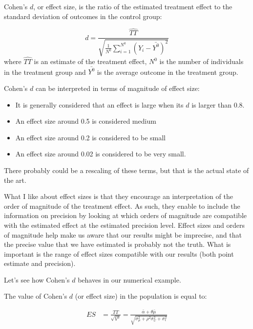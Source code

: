 \documentclass[]{book}
\providecommand{\tightlist}{%
  \setlength{\itemsep}{0pt}\setlength{\parskip}{0pt}}
\theoremstyle{definition}
\theoremstyle{definition}
\theoremstyle{definition}
\theoremstyle{remark}
\let\BeginKnitrBlock\begin \let\EndKnitrBlock\end
\begin{document}
\BeginKnitrBlock{definition}[Cohen's $d$]
\protect\hypertarget{def:unnamed-chunk-40}{}{\label{def:unnamed-chunk-40} \iffalse (Cohen's \(d\)) \fi{} }Cohen's \(d\), or effect size, is the ratio of the estimated treatment effect to the standard deviation of outcomes in the control group:
\EndKnitrBlock{definition}

\[
d = \frac{\hat{TT}}{\sqrt{\frac{1}{N^0}\sum_{i=1}^{N^0}(Y_i-\bar{Y^0})^2}}
\]
where \(\hat{TT}\) is an estimate of the treatment effect, \(N^0\) is the number of individuals in the treatment group and \(\bar{Y^0}\) is the average outcome in the treatment group.

Cohen's \(d\) can be interpreted in terms of magnitude of effect size:

\begin{itemize}
\tightlist
\item
  It is generally considered that an effect is large when its \(d\) is larger than 0.8.
\item
  An effect size around 0.5 is considered medium
\item
  An effect size around 0.2 is considered to be small
\item
  An effect size around 0.02 is considered to be very small.
\end{itemize}

There probably could be a rescaling of these terms, but that is the actual state of the art.

What I like about effect sizes is that they encourage an interpretation of the order of magnitude of the treatment effect.
As such, they enable to include the information on precision by looking at which orders of magnitude are compatible with the estimated effect at the estimated precision level.
Effect sizes and orders of magnitude help make us aware that our results might be imprecise, and that the precise value that we have estimated is probably not the truth.
What is important is the range of effect sizes compatible with our results (both point estimate and precision).

\BeginKnitrBlock{example}
\protect\hypertarget{exm:unnamed-chunk-41}{}{\label{exm:unnamed-chunk-41} }Let's see how Cohen's \(d\) behaves in our numerical example.
\EndKnitrBlock{example}

The value of Cohen's \(d\) (or effect size) in the population is equal to:

\begin{align*}
  ES & = \frac{TT}{\sqrt{V^0}} = \frac{\bar{\alpha}+\theta\bar{\mu}}{\sqrt{\sigma^2_{\mu}+\rho^2\sigma^2_{U}+\sigma^2_{\epsilon}}}
\end{align*}
\end{document}
